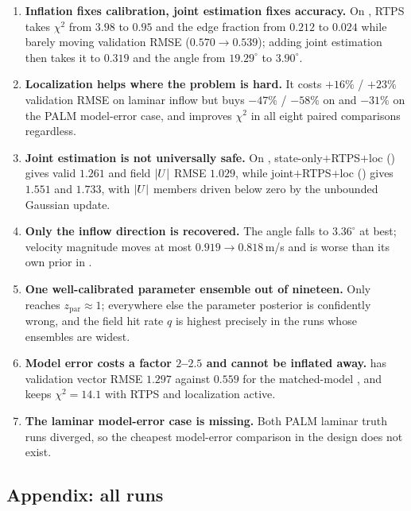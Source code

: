 \begin{enumerate}[nosep]
  \item \textbf{Inflation fixes calibration, joint estimation fixes accuracy.}
        On , RTPS takes $\chi^2$ from $3.98$ to $0.95$ and the
        edge fraction from $0.212$ to $0.024$ while barely moving validation
        RMSE ($0.570 \to 0.539$); adding joint estimation then takes it to
        $0.319$ and the angle from $19.29^\circ$ to $3.90^\circ$.
  \item \textbf{Localization helps where the problem is hard.} It costs $+16\%$
        / $+23\%$ validation RMSE on laminar inflow but buys $-47\%$ / $-58\%$
        on  and $-31\%$ on the PALM model-error case, and
        improves $\chi^2$ in all eight paired comparisons regardless.
  \item \textbf{Joint estimation is not universally safe.} On ,
        state-only$+$RTPS$+$loc () gives valid $1.261$ and field
        $|U|$ RMSE $1.029$, while joint$+$RTPS$+$loc () gives
        $1.551$ and $1.733$, with $|U|$ members driven below zero by the
        unbounded Gaussian update.
  \item \textbf{Only the inflow direction is recovered.} The angle falls to
        $3.36^\circ$ at best; velocity magnitude moves at most $0.919 \to
        0.818$\,m/s and is worse than its own prior in .
  \item \textbf{One well-calibrated parameter ensemble out of nineteen.} Only
         reaches $z_\mathrm{par} \approx 1$; everywhere else the
        parameter posterior is confidently wrong, and the field hit rate $q$ is
        highest precisely in the runs whose ensembles are widest.
  \item \textbf{Model error costs a factor $2$--$2.5$ and cannot be inflated
        away.}  has validation vector RMSE $1.297$ against $0.559$ for
        the matched-model , and keeps $\chi^2 = 14.1$ with RTPS and
        localization active.
  \item \textbf{The laminar model-error case is missing.} Both PALM laminar
        truth runs diverged, so the cheapest model-error comparison in the
        design does not exist.
\end{enumerate}

\subsection{Appendix: all runs}
\label{sec:filt-appendix}

